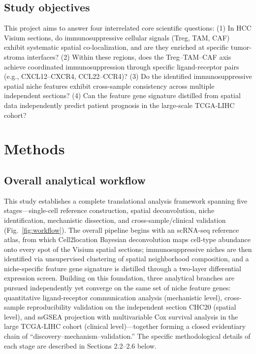 \documentclass[12pt, a4paper]{article}
\begin{document}
\subsection{Study objectives}

This project aims to answer four interrelated core scientific questions: (1) In HCC Visium sections, do immunosuppressive cellular signals (Treg, TAM, CAF) exhibit systematic spatial co-localization, and are they enriched at specific tumor-stroma interfaces? (2) Within these regions, does the Treg--TAM--CAF axis achieve coordinated immunosuppression through specific ligand-receptor pairs (e.g., CXCL12--CXCR4, CCL22--CCR4)? (3) Do the identified immunosuppressive spatial niche features exhibit cross-sample consistency across multiple independent sections? (4) Can the feature gene signature distilled from spatial data independently predict patient prognosis in the large-scale TCGA-LIHC cohort?


\section{Methods}

\subsection{Overall analytical workflow}

This study establishes a complete translational analysis framework spanning five stages—single-cell reference construction, spatial deconvolution, niche identification, mechanistic dissection, and cross-sample/clinical validation (Fig.~\ref{fig:workflow}). The overall pipeline begins with an scRNA-seq reference atlas, from which Cell2location Bayesian deconvolution maps cell-type abundance onto every spot of the Visium spatial sections; immunosuppressive niches are then identified via unsupervised clustering of spatial neighborhood composition, and a niche-specific feature gene signature is distilled through a two-layer differential expression screen. Building on this foundation, three analytical branches are pursued independently yet converge on the same set of niche feature genes: quantitative ligand-receptor communication analysis (mechanistic level), cross-sample reproducibility validation on the independent section CHC20 (spatial level), and ssGSEA projection with multivariable Cox survival analysis in the large TCGA-LIHC cohort (clinical level)—together forming a closed evidentiary chain of ``discovery--mechanism--validation.'' The specific methodological details of each stage are described in Sections 2.2--2.6 below.
\end{document}
